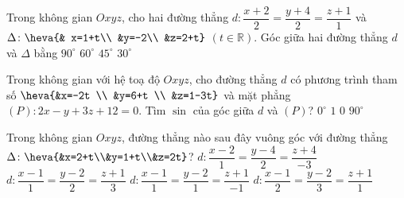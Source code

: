\begin{ex}%
	Trong không gian $Oxyz$, cho hai đường thẳng $d\colon \dfrac{x+2}{2}=\dfrac{y+4}{2}=\dfrac{z+1}{1}$ và $\Delta\colon \heva{& x=1+t\\ &y=-2\\ &z=2+t}$ $(t \in \mathbb{R})$. Góc giữa hai đường thẳng $d$ và $\Delta$ bằng 
	 \choice
		{$90^{\circ}$} 
		 {$60^{\circ}$}
		 {\True $45^{\circ}$}
		{$30^{\circ}$} 
\end{ex}

\begin{ex}%
	Trong không gian với hệ toạ độ $Oxyz$, cho đường thẳng $d$ có phương trình tham số $\heva{&x=-2t \\ &y=6+t \\ &z=1-3t}$ và mặt phẳng  $(P)\colon 2x-y+3z+12=0$. Tìm $\sin$ của góc giữa $d$ và $(P)$?
	 \choice
		{$0^\circ$} 
		{\True  $1$}
		{$0$} 
		 {$90^\circ$}
\end{ex}

\begin{ex}%
	Trong không gian $Oxyz$,  đường thẳng nào sau đây vuông góc với đường thẳng $\Delta\colon\heva{&x=2+t\\&y=1+t\\&z=2t}$?
	\choice 
		 {$d\colon\dfrac{x-2}{1}=\dfrac{y-4}{2}=\dfrac{z+4}{-3}$}
		{$d\colon\dfrac{x-1}{1}=\dfrac{y-2}{2}=\dfrac{z+1}{3}$} 
		 {\True $d\colon\dfrac{x-1}{1}=\dfrac{y-2}{1}=\dfrac{z+1}{-1}$}
		{$d\colon\dfrac{x-1}{2}=\dfrac{y-2}{3}=\dfrac{z+1}{1}$} 
\end{ex}

